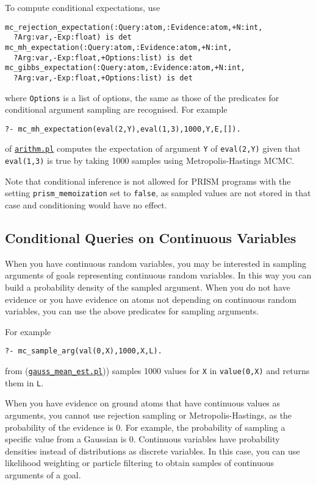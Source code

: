 To compute conditional expectations, use
\begin{verbatim}
mc_rejection_expectation(:Query:atom,:Evidence:atom,+N:int,
  ?Arg:var,-Exp:float) is det
mc_mh_expectation(:Query:atom,:Evidence:atom,+N:int,
  ?Arg:var,-Exp:float,+Options:list) is det
mc_gibbs_expectation(:Query:atom,:Evidence:atom,+N:int,
  ?Arg:var,-Exp:float,+Options:list) is det
\end{verbatim}
where \verb|Options| is a list of options, the same as those of the predicates for conditional argument 
sampling are recognised.
For example
\begin{verbatim}
?- mc_mh_expectation(eval(2,Y),eval(1,3),1000,Y,E,[]).
\end{verbatim}
of \href{http://cplint.eu/example/inference/arithm.pl}{\texttt{arithm.pl}}
computes the expectation of argument \verb|Y| of \verb|eval(2,Y)| given that
\verb|eval(1,3)| is true by taking 1000 samples using Metropolis-Hastings MCMC.

Note that conditional inference  is not allowed for PRISM programs with the setting \verb|prism_memoization| set to
\verb|false|, as sampled values are not stored in that case and conditioning would have no effect.

\subsection{Conditional Queries on Continuous Variables}
\label{condqcont}

When you have continuous random variables, you may be interested in
sampling arguments of goals representing continuous random variables.
In this way you can build a probability density of the sampled argument.
When you do not have evidence or you have evidence on atoms not depending
on continuous random variables, you can use the above predicates for sampling
arguments.

For example
\begin{verbatim}
?- mc_sample_arg(val(0,X),1000,X,L).
\end{verbatim}
from (\href{http://cplint.eu/example/inference/gauss_mean_est.pl}{\texttt{gauss\_mean\_est.pl}})) samples 1000 values for \verb|X| in
\verb|value(0,X)| and returns them in \verb|L|.

When you have evidence on ground atoms that have continuous values as
arguments, you cannot use rejection sampling or Metropolis-Hastings,
as the probability of the evidence is 0. For example,
the probability of sampling a specific value from a Gaussian is 0.
Continuous variables have probability densities instead of distributions as
discrete variables.
In this case, you can use likelihood weighting or particle filtering \cite{fung1990weighing,koller2009probabilistic,Nitti2016} to obtain samples of
continuous arguments of a goal.

